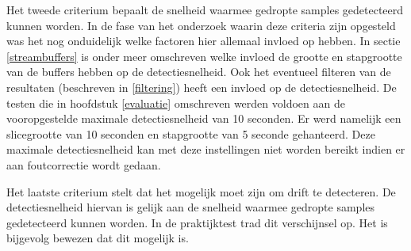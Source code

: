 Het tweede criterium bepaalt de snelheid waarmee gedropte samples gedetecteerd kunnen worden. In de fase van het onderzoek waarin deze criteria zijn opgesteld was het nog onduidelijk welke factoren hier allemaal invloed op hebben. In sectie \ref{streambuffers} is onder meer omschreven welke invloed de grootte en stapgrootte van de buffers hebben op de detectiesnelheid. Ook het eventueel filteren van de resultaten (beschreven in \ref{filtering}) heeft een invloed op de detectiesnelheid. De testen die in hoofdstuk \ref{evaluatie} omschreven werden voldoen aan de vooropgestelde maximale detectiesnelheid van 10 seconden. Er werd namelijk een slicegrootte van 10 seconden en stapgrootte van 5 seconde gehanteerd. Deze maximale detectiesnelheid kan met deze instellingen niet worden bereikt indien er aan foutcorrectie wordt gedaan.

Het laatste criterium stelt dat het mogelijk moet zijn om drift te detecteren. De detectiesnelheid hiervan is gelijk aan de snelheid waarmee gedropte samples gedetecteerd kunnen worden. In de praktijktest trad dit verschijnsel op. Het is bijgevolg bewezen dat dit mogelijk is.